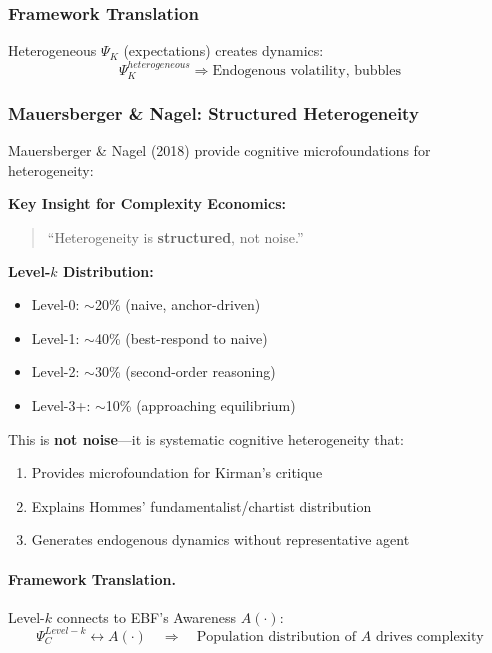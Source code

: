 \subsubsection{Framework Translation}

Heterogeneous $\Psi_K$ (expectations) creates dynamics:
\begin{equation}
\Psi_K^{heterogeneous} \Rightarrow \text{Endogenous volatility, bubbles}
\end{equation}

\subsubsection{Mauersberger \& Nagel: Structured Heterogeneity}

Mauersberger \& Nagel (2018) provide cognitive microfoundations for heterogeneity:

\begin{tcolorbox}[colback=yellow!5!white, colframe=yellow!75!black,
    title=\textbf{M\&N (2018): Level-$k$ as Structured Heterogeneity}]

\textbf{Key Insight for Complexity Economics:}
\begin{quote}
``Heterogeneity is \textbf{structured}, not noise.''
\end{quote}

\textbf{Level-$k$ Distribution:}
\begin{itemize}[nosep]
    \item Level-0: $\sim$20\% (naive, anchor-driven)
    \item Level-1: $\sim$40\% (best-respond to naive)
    \item Level-2: $\sim$30\% (second-order reasoning)
    \item Level-3+: $\sim$10\% (approaching equilibrium)
\end{itemize}

This is \textbf{not noise}---it is systematic cognitive heterogeneity that:
\begin{enumerate}[nosep]
    \item Provides microfoundation for Kirman's critique
    \item Explains Hommes' fundamentalist/chartist distribution
    \item Generates endogenous dynamics without representative agent
\end{enumerate}

\end{tcolorbox}

\paragraph{Framework Translation.}
Level-$k$ connects to EBF's Awareness $A(\cdot)$:
\begin{equation}
\Psi_C^{Level-k} \leftrightarrow A(\cdot) \quad \Rightarrow \quad
\text{Population distribution of } A \text{ drives complexity}
\end{equation}

